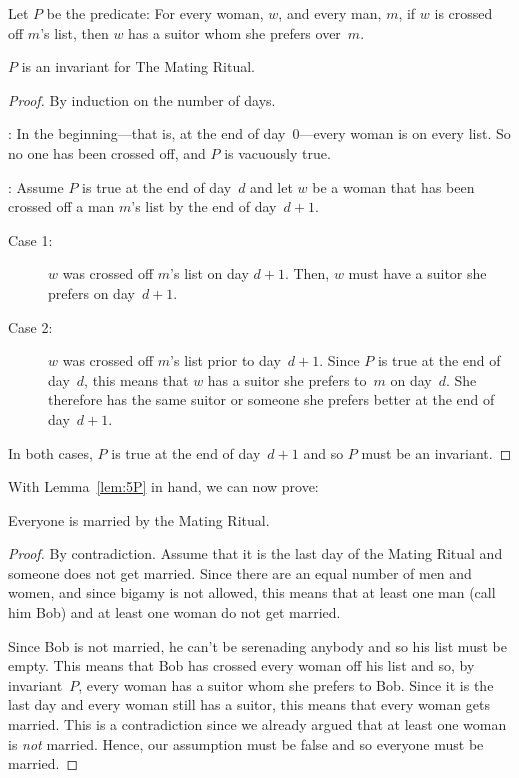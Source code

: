 \begin{definition}\label{def:P8}
Let $P$ be the predicate: For every woman, $w$, and every man, $m$, if
$w$ is crossed off $m$'s list, then $w$ has a suitor whom she prefers
over~$m$.
\end{definition}

\begin{lemma}\label{lem:5P}
$P$ is an invariant for The Mating Ritual.
\end{lemma}

\begin{proof}
By induction on the number of days.

: In the beginning---that is, at the end of
day~0---every woman is on every list.  So no one has been crossed off, and
$P$ is vacuously true.

: Assume $P$ is true at the end of
day~$d$ and let $w$ be a woman that has been crossed off a man $m$'s
list by the end of day~$d + 1$.

\begin{description}

\item[Case 1:]
$w$ was crossed off $m$'s list on day $d + 1$.  Then, $w$ must have a
  suitor she prefers on day~$d+1$.

\item[Case 2:]
$w$ was crossed off $m$'s list prior to day~$d+1$.  Since $P$ is true
  at the end of day~$d$, this means that $w$ has a suitor she prefers
  to~$m$ on day~$d$.  She therefore has the same suitor or someone she
  prefers better at the end of day~$d + 1$.

\end{description}
In both cases, $P$ is true at the end of day~$d + 1$ and so $P$ must
be an invariant.
\end{proof}

With Lemma~\ref{lem:5P} in hand, we can now prove:

\begin{theorem}
Everyone is married by the Mating Ritual.
\end{theorem}

\begin{proof}
By contradiction. Assume that it is the last day of the Mating Ritual
and someone does not get married.  Since there are an equal number of
men and women, and since bigamy is not allowed, this means that at
least one man (call him Bob) and at least one woman do not get
married.

Since Bob is not married, he can't be serenading anybody and so his
list must be empty.  This means that Bob has crossed every woman off
his list and so, by invariant~$P$, every woman has a suitor whom she
prefers to Bob.  Since it is the last day and every woman still has a
suitor, this means that every woman gets married.  This is a
contradiction since we already argued that at least one woman is
\emph{not} married.  Hence, our assumption must be false and so
everyone must be married.
\end{proof}

